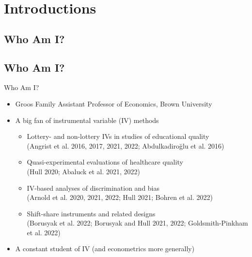 \documentclass{beamer}
\begin{document}

\section{Introductions}

\subsection{Who Am I?}
\subsection{Who Am I?}
\begin{frame}{Who Am I?}
\begin{itemize}
\item Groos Family Assistant Professor of Economics, Brown University\pause{}\smallskip
\item A big fan of instrumental variable (IV) methods\pause{}
\begin{itemize}
\item Lottery- and non-lottery IVs in studies of educational quality \\ {\scriptsize \textcolor{red!75!green!50!blue!25!gray}{(Angrist et al. 2016, 2017, 2021, 2022; Abdulkadiro\u{g}lu et al. 2016)}}
\item Quasi-experimental evaluations of healthcare quality \\ {\scriptsize \textcolor{red!75!green!50!blue!25!gray}{(Hull 2020; Abaluck et al. 2021, 2022)}}
\item IV-based analyses of discrimination and bias \\ {\scriptsize \textcolor{red!75!green!50!blue!25!gray}{(Arnold et al. 2020, 2021, 2022; Hull 2021; Bohren et al. 2022)}}
\item Shift-share instruments and related designs \\ {\scriptsize \textcolor{red!75!green!50!blue!25!gray}{(Borusyak et al. 2022; Borusyak and Hull 2021, 2022; Goldsmith-Pinkham et al. 2022)}}
\end{itemize}\pause{}\smallskip
\item A constant student of IV (and econometrics more generally)
\end{itemize}
\end{frame}
\end{document}
